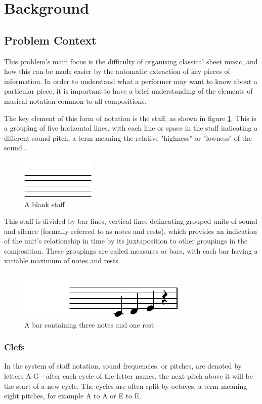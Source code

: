 \section{Background}
\subsection{Problem Context}
This problem's main focus is the difficulty of organising classical sheet music, and how this can be made easier by the automatic extraction of key pieces  of information. In order to understand what a performer may want to know about a particular piece, it is important to have a brief understanding of the elements of musical notation common to all compositions.

The key element of this form of notation is the staff, as shown in figure \ref{fig:staff}. This is a grouping of five horizontal lines, with each line or space in the staff indicating a different sound pitch, a term meaning the relative "highness" or "lowness" of the sound \parencite{classroom}.

\begin{figure}[h]
    \centering
        \includegraphics{staff-crop.pdf}
    \caption{A blank staff}
    \label{fig:staff}
\end{figure}

This staff is divided by bar lines, vertical lines delineating grouped units of sound and silence (formally referred to as notes and rests), which provides an indication of the unit's relationship in time by its juxtaposition to other groupings in the composition. These groupings are called measures or bars, with each bar having a variable maximum of notes and rests. 

\begin{figure}[h]
    \centering
        \includegraphics{bar_with_notes-crop.pdf}
    \caption{A bar containing three notes and one rest}
    \label{fig:staff-notes}
\end{figure}
\subsubsection{Clefs}
In the system of staff notation, sound frequencies, or pitches, are denoted by letters A-G - after each cycle of the letter names, the next pitch above it will be the start of a new cycle. The cycles are often split by octaves, a term meaning eight pitches, for example A to A or E to E. 

